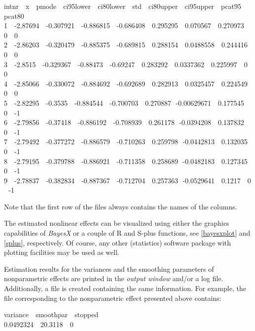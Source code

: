 \footnotesize
 intnr \,\, x \,\, pmode \,\, ci95lower \,\, ci80lower \,\, std \,\, ci80upper \,\, ci95upper \,\, pcat95 \,\, pcat80\\
 1 \,\, -2.87694 \,\, -0.307921 \,\, -0.886815 \,\, -0.686408 \,\, 0.295295 \,\, 0.070567   \,\, 0.270973 \,\, 0 \,\, 0\\
 2 \,\, -2.86203 \,\, -0.320479 \,\, -0.885375 \,\, -0.689815 \,\, 0.288154 \,\, 0.0488558  \,\, 0.244416 \,\, 0 \,\, 0\\
 3 \,\, -2.8515  \,\, -0.329367 \,\, -0.88473  \,\, -0.69247  \,\, 0.283292 \,\, 0.0337362  \,\, 0.225997 \,\, 0 \,\, 0\\
 4 \,\, -2.85066 \,\, -0.330072 \,\, -0.884692 \,\, -0.692689 \,\, 0.282913 \,\, 0.0325457  \,\, 0.224549 \,\, 0 \,\, 0\\
 5 \,\, -2.82295 \,\, -0.3535   \,\, -0.884544 \,\, -0.700703 \,\, 0.270887 \,\,-0.00629671 \,\, 0.177545 \,\, 0 \,\, -1\\
 6 \,\, -2.79856 \,\, -0.37418  \,\, -0.886192 \,\, -0.708939 \,\, 0.261178 \,\,-0.0394208  \,\, 0.137832 \,\, 0 \,\, -1\\
 7 \,\, -2.79492 \,\, -0.377272 \,\, -0.886579 \,\, -0.710263 \,\, 0.259798 \,\,-0.0442813  \,\, 0.132035 \,\, 0 \,\, -1\\
 8 \,\, -2.79195 \,\, -0.379788 \,\, -0.886921 \,\, -0.711358 \,\, 0.258689 \,\,-0.0482183  \,\, 0.127345 \,\, 0 \,\, -1\\
 9 \,\, -2.78837 \,\, -0.382834 \,\, -0.887367 \,\, -0.712704 \,\, 0.257363 \,\,-0.0529641  \,\, 0.1217   \,\, 0 \,\, -1
\normalsize

Note that the first row of the files always contains the names of
the columns.

The estimated nonlinear effects can be visualized using either the
graphics capabilities of {\em BayesX} or a couple of R and S-plus
functions,  see \autoref{bayesxplot} and \autoref{splus},
respectively. Of course, any other (statistics) software package
with plotting facilities may be used as well.

Estimation results for the variances and the smoothing parameters
of nonparametric effects are printed in the {\em output window}
and/or a log file. Additionally, a file is created containing the
same information. For example, the file corresponding to the
nonparametric effect presented above contains:

\footnotesize
 variance \,\, smoothpar \,\, stopped\\
 0.0492324 \,\, 20.3118 \,\, 0
\normalsize

